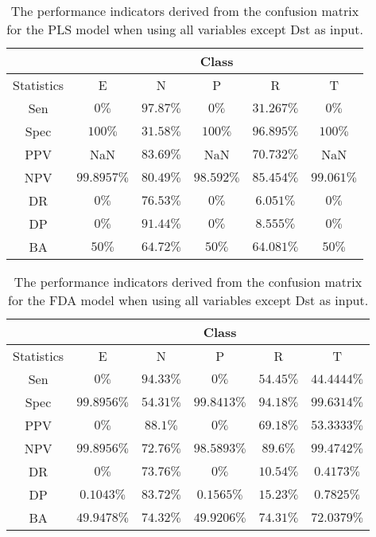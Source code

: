 \begin{table}[!ht]
	\centering
	\begin{tabular}{|c|c|c|c|c|c|}
		\hline
		 & \multicolumn{5}{c|}{Class} \\ \hline
		Statistics & E & N & P & R & T \\ \hline
		Sen & $0\%$ & $97.87\%$ & $0\%$ & $31.267\%$ & $0\%$ \\ \hline
		Spec & $100\%$ & $31.58\%$ & $100\%$ & $96.895\%$ & $100\%$ \\ \hline
		PPV & NaN & $83.69\%$ & NaN & $70.732\%$ & NaN \\ \hline
		NPV & $99.8957\%$ & $80.49\%$ & $98.592\%$ & $85.454\%$ & $99.061\%$ \\ \hline
		DR & $0\%$ & $76.53\%$ & $0\%$ & $6.051\%$ & $0\%$ \\ \hline
		DP & $0\%$ & $91.44\%$ & $0\%$ & $8.555\%$ & $0\%$ \\ \hline
		BA & $50\%$ & $64.72\%$ & $50\%$ & $64.081\%$ & $50\%$ \\ \hline
	\end{tabular}
	\caption{The performance indicators derived from the confusion matrix for the PLS model when using all variables except Dst as input.}
	\label{tab:cs:reverse:noDst:pls}
\end{table}

\begin{table}[!ht]
	\centering
	\begin{tabular}{|c|c|c|c|c|c|}
		\hline
		 & \multicolumn{5}{c|}{Class} \\ \hline
		Statistics & E & N & P & R & T \\ \hline
		Sen & $0\%$ & $94.33\%$ & $0\%$ & $54.45\%$ & $44.4444\%$ \\ \hline
		Spec & $99.8956\%$ & $54.31\%$ & $99.8413\%$ & $94.18\%$ & $99.6314\%$ \\ \hline
		PPV & $0\%$ & $88.1\%$ & $0\%$ & $69.18\%$ & $53.3333\%$ \\ \hline
		NPV & $99.8956\%$ & $72.76\%$ & $98.5893\%$ & $89.6\%$ & $99.4742\%$ \\ \hline
		DR & $0\%$ & $73.76\%$ & $0\%$ & $10.54\%$ & $0.4173\%$ \\ \hline
		DP & $0.1043\%$ & $83.72\%$ & $0.1565\%$ & $15.23\%$ & $0.7825\%$ \\ \hline
		BA & $49.9478\%$ & $74.32\%$ & $49.9206\%$ & $74.31\%$ & $72.0379\%$ \\ \hline
	\end{tabular}
	\caption{The performance indicators derived from the confusion matrix for the FDA model when using all variables except Dst as input.}
	\label{tab:cs:reverse:noDst:fda}
\end{table}

